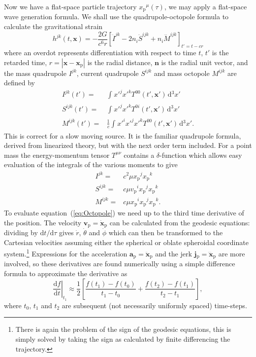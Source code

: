 \documentclass[a4paper, 11pt, titlepage, twoside]{report}
\newcommand{\eqnref}[1]{equation~(\ref{eq:#1})}
\newcommand{\sub}[1]{\ensuremath{_\mathrm{#1}}}
\newcommand{\recip}[1]{\ensuremath{\frac{1}{#1}}}
\newcommand{\dd}{\ensuremath{\mathrm{d}}}
\newcommand{\diff}[2]{\ensuremath{\frac{\dd {#1}}{\dd {#2}}}}
\newcommand{\linediff}[2]{\ensuremath{\dd {#1}/\dd {#2}}}
\newcommand{\intd}[4]{\ensuremath{\int_{#1}^{#2}{#3}\,\dd{#4}}}
\begin{document}
{Now we have a flat-space particle trajectory ${x\sub{p}}^\mu(\tau)$, we may apply a flat-space wave generation formula. We shall use the quadrupole-octopole formula to calculate the gravitational strain\cite{Press1977, Bekenstein1973}
\begin{equation}
h^{jk}(t, \boldsymbol{x}) = -\frac{2G}{c^6r}\left[\ddot{I}^{jk} - 2n_i\ddot{S}^{ijk} + n_i\dddot{M}^{ijk}\right]_{t' = t - cr}
\label{eq:Octopole}
\end{equation}
where an overdot represents differentiation with respect to time $t$, $t'$ is the retarded time, $r = \left|\boldsymbol{x} - \boldsymbol{x}\sub{p}\right|$ is the radial distance, $\boldsymbol{n}$ is the radial unit vector, and the mass quadrupole ${I}^{jk}$, current quadrupole ${S}^{ijk}$ and mass octopole ${M}^{ijk}$ are defined by
\begin{align}
{I}^{jk}(t') = {} & \intd{}{}{{x'}^j{x'}^kT^{00}(t', \boldsymbol{x'})}{^3x'}\\
{S}^{ijk}(t') = {} & \intd{}{}{{x'}^j{x'}^kT^{0i}(t', \boldsymbol{x'})}{^3x'}\\
{M}^{ijk}(t') = {} & \recip{c}\intd{}{}{{x'}^i{x'}^j{x'}^kT^{00}(t', \boldsymbol{x'})}{^3x'}.
\end{align}
This is correct for a slow moving source. It is the familiar quadrupole formula\cite{Misner1973, Hobson2006}, derived from linearized theory, but with the next order term included. For a point mass the energy-momentum tensor $T^{\mu\nu}$ contains a $\delta$-function which allows easy evaluation of the integrals of the various moments to give
\begin{align}
{I}^{jk} = {} & c^2\mu x\sub{p}^jx\sub{p}^k\\
{S}^{ijk} = {} & c\mu v\sub{p}^ix\sub{p}^jx\sub{p}^k\\
{M}^{ijk} = {} & c\mu x\sub{p}^ix\sub{p}^jx\sub{p}^k.
\end{align}
To evaluate \eqnref{Octopole} we need up to the third time derivative of the position. The velocity $\boldsymbol{v}\sub{p} = \dot{\boldsymbol{x}}\sub{p}$ can be calculated from the geodesic equations: dividing by $\linediff{t}{\tau}$ gives $\dot{r}$, $\dot{\theta}$ and $\dot{\phi}$ which can then be transformed to the Cartesian velocities assuming either the spherical or oblate spheroidal coordinate system.\footnote{There is again the problem of the sign of the geodesic equations, this is simply solved by taking the sign as calculated by finite differencing the trajectory.} Expressions for the acceleration $\boldsymbol{a}\sub{p} = \ddot{\boldsymbol{x}}\sub{p}$ and the jerk $\boldsymbol{j}\sub{p} = \dddot{\boldsymbol{x}}\sub{p}$ are more involved, so these derivatives are found numerically using a simple difference formula to approximate the derivative as
\begin{equation}
\left.\diff{f}{t}\right|_{t_1} \approx \recip{2}\left[\frac{f(t_1) - f(t_0)}{t_1 - t_0} + \frac{f(t_2) - f(t_1)}{t_2 - t_1}\right],
\end{equation}
where $t_0$, $t_1$ and $t_2$ are subsequent (not necessarily uniformly spaced) time-steps.

}
\end{document}
